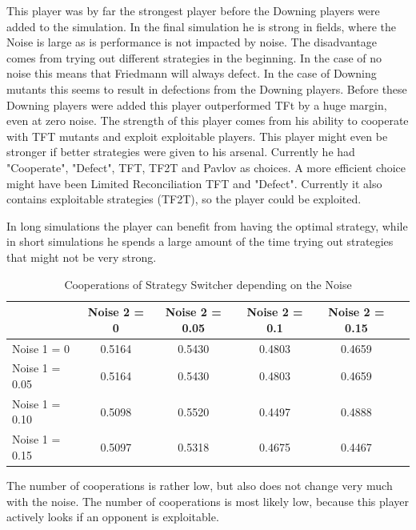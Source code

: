This player was by far the strongest player before the Downing players were added to the simulation. In the final simulation he is strong in fields, where the Noise is large as is performance is not impacted by noise. The disadvantage comes from trying out different strategies in the beginning. In the case of no noise this means that Friedmann will always defect. In the case of Downing mutants this seems to result in defections from the Downing players. Before these Downing players were added this player outperformed TFt by a huge margin, even at zero noise. The strength of this player comes from his ability to cooperate with TFT mutants and exploit exploitable players. This player might even be stronger if better strategies were given to his arsenal. Currently he had "Cooperate", "Defect", TFT, TF2T and Pavlov as choices. A more efficient choice might have been Limited Reconciliation TFT and "Defect". Currently it also contains exploitable strategies (TF2T), so the player could be exploited.

In long simulations the player can benefit from having the optimal strategy, while in short simulations he spends a large amount of the time trying out strategies that might not be very strong.

\begin{table}[h]
 \begin{center}
\caption{Cooperations of Strategy Switcher depending on the Noise} \vspace{3mm}
\begin{tabular}{|l|c|c|c|c|c|}
\hline
   	& Noise 2 = 0 & Noise 2 = 0.05& Noise 2 = 0.1& Noise 2 = 0.15 \\
  \hline
  Noise 1 = 0 	&     0.5164 &   0.5430  &  0.4803  &  0.4659 \\
 \hline
  Noise 1 = 0.05	 &    0.5164  &  0.5430   & 0.4803   & 0.4659 \\
 \hline
  Noise 1 = 0.10 	&    0.5098  &  0.5520  &  0.4497 &   0.4888 \\
 \hline
  Noise 1 = 0.15 	&        0.5097  &  0.5318 &   0.4675 &   0.4467 \\
 \hline
\end{tabular}
 \end{center}
\end{table}

The number of cooperations is rather low, but also does not change very much with the noise. The number of cooperations is most likely low, because this player actively looks if an opponent is exploitable.

